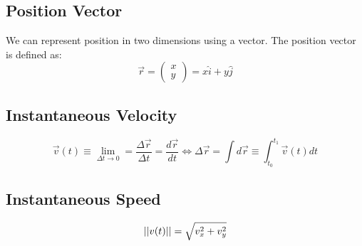 \documentclass[article, 11pt]{article}
\theoremstyle{definition}
\DeclarePairedDelimiter\abs{\lvert}{\rvert} %
\begin{document}
    \subsection{Position Vector}
    We can represent position in two dimensions using a vector. The position vector is defined as:
    \begin{equation}
        \vec{r} = \begin{pmatrix} x \\ y \end{pmatrix} = x\hat{i} + y\hat{j}
        \label{eq:position vector}
    \end{equation}
    \subsection{Instantaneous Velocity}
    \begin{equation}
        \vec{v}(t) \equiv \lim_{\Delta t \to 0} = \frac{\Delta \vec{r}}{\Delta t} = \frac{d\vec{r}}{dt} \iff \Delta \vec{r} = \int d\vec{r} \equiv \int_{t_0}^{t_1} \vec{v}(t) dt
        \label{eq:instantaneous velocity 2d}
    \end{equation}
    \subsection{Instantaneous Speed}
    \begin{equation}
        \abs*{\abs*{v(t)}} = \sqrt{v_x^2 + v_y^2}
        \label{eq:instantaneous speed 2d}
    \end{equation}
\end{document}
